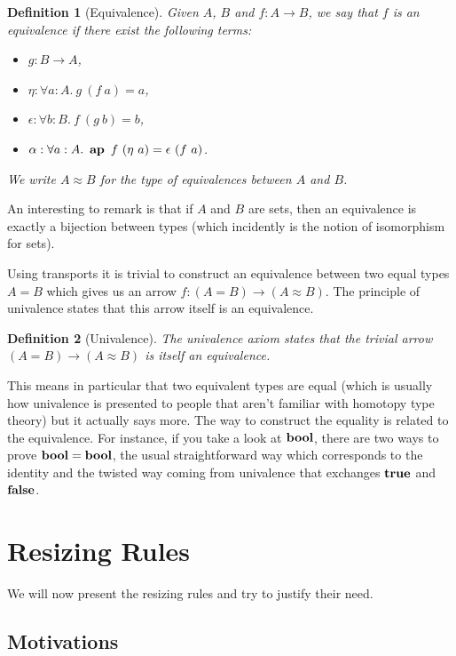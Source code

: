 \documentclass[11pt]{article}
\theoremstyle{plain}
\newtheorem{definition}{Definition}
\theoremstyle{remark}
\begin{document}
\begin{definition}[Equivalence]
  Given $A$, $B$ and $f : A \to B$, we say that $f$ is an equivalence
  if there exist the following terms:
  \begin{itemize}
    \item $g : B \to A$,
    \item $\eta : \forall a:A.\ g\ (f\ a) = a$,
    \item $\epsilon : \forall b:B.\ f\ (g\ b) = b$,
    \item $\alpha : \forall a:A.\ \ap\ f\ (\eta\ a) = \epsilon\ (f\ a)$.
  \end{itemize}
  We write $A \approx B$ for the type of equivalences between $A$ and $B$.
\end{definition}

\noindent
An interesting to remark is that if $A$ and $B$ are sets, then an equivalence is
exactly a bijection between types (which incidently is the notion of isomorphism
for sets).

Using transports it is trivial to construct an equivalence between two equal
types $A = B$ which gives us an arrow $f : (A = B) \to (A \approx B)$.
The principle of univalence states that this arrow itself is an equivalence.

\begin{definition}[Univalence]
  The univalence axiom states that
  the trivial arrow $(A = B) \to (A \approx B)$ is itself an equivalence.
\end{definition}

\noindent
This means in particular that two equivalent types are equal (which is usually
how univalence is presented to people that aren't familiar with homotopy type
theory) but it actually says more. The way to construct the equality is related
to the equivalence.
For instance, if you take a look at $\operatorname{\mathbf{bool}}$, there are two ways to prove
$\operatorname{\mathbf{bool}} = \operatorname{\mathbf{bool}}$, the usual straightforward way which corresponds to the identity
and the twisted way coming from univalence that exchanges $\operatorname{\mathbf{true}}$ and $\operatorname{\mathbf{false}}$.

\section{Resizing Rules}

We will now present the resizing rules and try to justify their need.

\subsection{Motivations}
\end{document}
